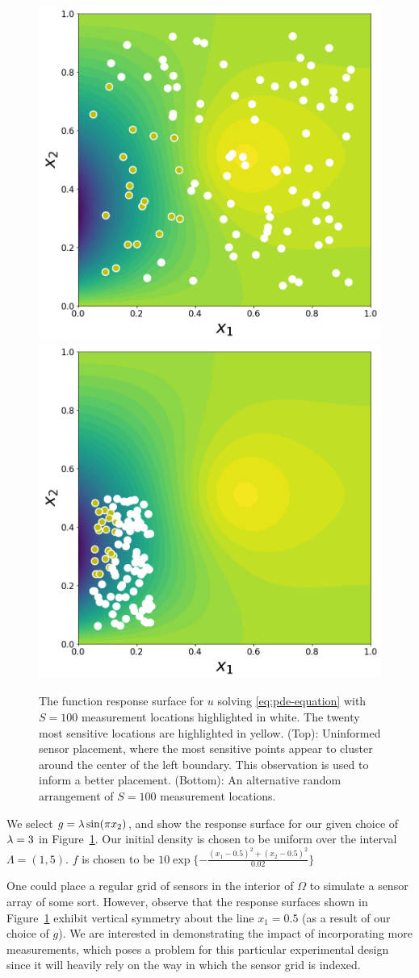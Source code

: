 \begin{figure}[htbp]
\centering
  \includegraphics[width=0.475\linewidth]{figures/pde/pde_reference_solution}
  \includegraphics[width=0.475\linewidth]{figures/pde/pde-alt_reference_solution}
\caption{The function response surface for $u$ solving \eqref{eq:pde-equation} with $S=100$ measurement locations highlighted in white.
The twenty most sensitive locations are highlighted in yellow.
(Top): Uninformed sensor placement, where the most sensitive points  appear to cluster around the center of the  left boundary.
This observation is used to inform a better placement.
(Bottom): An alternative random arrangement of $S=100$ measurement locations.
}
\label{fig:pde-ref-solution}
\end{figure}
We select $g=\lambda \sin(\pi x_2)$, and show the response surface for our given choice of $\lambda = 3$ in Figure~\ref{fig:pde-ref-solution}.
Our initial density is chosen to be uniform over the interval $\Lambda = (1,5)$.
$f$ is chosen to be $10\exp\{-\frac{(x_1-0.5)^2 + (x_2 - 0.5)^2}{0.02}\}$



One could place a regular grid of sensors in the interior of $\Omega$ to simulate a sensor array of some sort.
However, observe that the response surfaces shown in Figure~\ref{fig:pde-ref-solution} exhibit vertical symmetry about the line $x_1=0.5$ (as a result of our choice of $g$).
We are interested in demonstrating the impact of incorporating more measurements, which poses a problem for this particular experimental design since it will heavily rely on the way in which the sensor grid is indexed.

